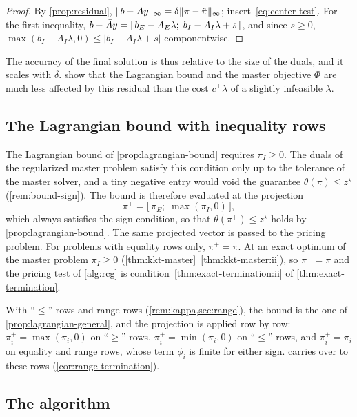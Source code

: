\begin{proof}
By \cref{prop:residual}, $\lVert b - \bar{A} y\rVert_\infty = \delta\lVert\pi - \hat{\pi}\rVert_\infty$;
insert~\eqref{eq:center-test}. For the first inequality, $b - \bar{A} y = [\,b_E - A_E\lambda;\;
b_I - A_I\lambda + s\,]$, and since $s\ge0$, $\max(b_I - A_I\lambda, 0)\le|b_I - A_I\lambda + s|$
componentwise.
\end{proof}

The accuracy of the final solution is thus relative to the size of the duals, and it scales
with $\delta$.  show that the Lagrangian bound and the master
objective $\Phi$ are much less affected by this residual than the cost $c^\top\lambda$ of a
slightly infeasible $\lambda$.

\subsection{The Lagrangian bound with inequality rows}
\label{sec:bound-ineq}

The Lagrangian bound of \cref{prop:lagrangian-bound} requires $\pi_I\ge0$. The duals of the
regularized master problem satisfy this condition only up to the tolerance of the master
solver, and a tiny negative entry would void the guarantee $\theta(\pi)\le z^\star$
(\cref{rem:bound-sign}). The
bound is therefore evaluated at the projection
\[
\pi^+ = \bigl[\,\pi_E;\;\max(\pi_I, 0)\,\bigr],
\]
which always satisfies the sign condition, so that $\theta(\pi^+)\le z^\star$ holds by
\cref{prop:lagrangian-bound}. The same projected vector is passed to the pricing problem.
For problems with equality rows only, $\pi^+ = \pi$. At an exact optimum of the master problem
$\pi_I\ge0$ (\cref{thm:kkt-master}~\ref{thm:kkt-master:ii}), so $\pi^+ = \pi$ and the pricing test of
\cref{alg:rcg} is condition~\ref{thm:exact-termination:ii} of \cref{thm:exact-termination}.

With ``$\le$'' rows and range rows (\cref{rem:kappa,sec:range}), the bound is the one of
\cref{prop:lagrangian-general}, and the projection is applied row by row:
$\pi^+_i = \max(\pi_i,0)$ on ``$\ge$'' rows, $\pi^+_i = \min(\pi_i,0)$ on ``$\le$'' rows, and
$\pi^+_i = \pi_i$ on equality and range rows, whose term $\phi_i$ is finite for either sign.
 carries over to these rows (\cref{cor:range-termination}).

\subsection{The algorithm}

